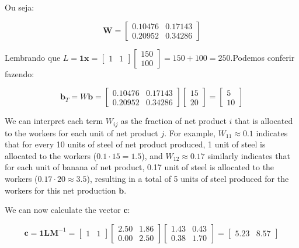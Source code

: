 Ou seja:

\begin{equation}
\boldsymbol{W}=\left[\begin{array}{cc}
0.10476 & 0.17143\\
0.20952 & 0.34286
\end{array}\right]
\end{equation}

Lembrando que $L=\boldsymbol{1}\boldsymbol{x}=\left[\begin{array}{cc}
1 & 1\end{array}\right]\left[\begin{array}{c}
150\\
100
\end{array}\right]=150+100=250$.Podemos conferir fazendo:

\begin{equation}
\boldsymbol{b}_{T}=W\boldsymbol{b}=\left[\begin{array}{cc}
0.10476 & 0.17143\\
0.20952 & 0.34286
\end{array}\right]\left[\begin{array}{c}
15\\
20
\end{array}\right]=\left[\begin{array}{c}
5\\
10
\end{array}\right]
\end{equation}

We can interpret each term $W_{ij}$ as the fraction of net product $i$ that is allocated to the workers for each unit of net product $j$. For example, $W_{11} \approx 0.1$ indicates that for every 10 units of steel of net product produced, 1 unit of steel is allocated to the workers ($0.1 \cdot 15 = 1.5$), and $W_{12} \approx 0.17$ similarly indicates that for each unit of banana of net product, 0.17 unit of steel is allocated to the workers ($0.17 \cdot 20 \approx 3.5$), resulting in a total of 5 units of steel produced for the workers for this net production $\boldsymbol{b}$.

We can now calculate the vector $\boldsymbol{c}$:


\begin{equation}
\boldsymbol{c}=\boldsymbol{1}\boldsymbol{L}\boldsymbol{M}^{-1}=\left[\begin{array}{cc}
1 & 1\end{array}\right]\left[\begin{array}{cc}
2.50 & 1.86\\
0.00 & 2.50
\end{array}\right]\left[\begin{array}{cc}
1.43 & 0.43\\
0.38 & 1.70
\end{array}\right]=\left[\begin{array}{cc}
5.23 & 8.57\end{array}\right]
\end{equation}

